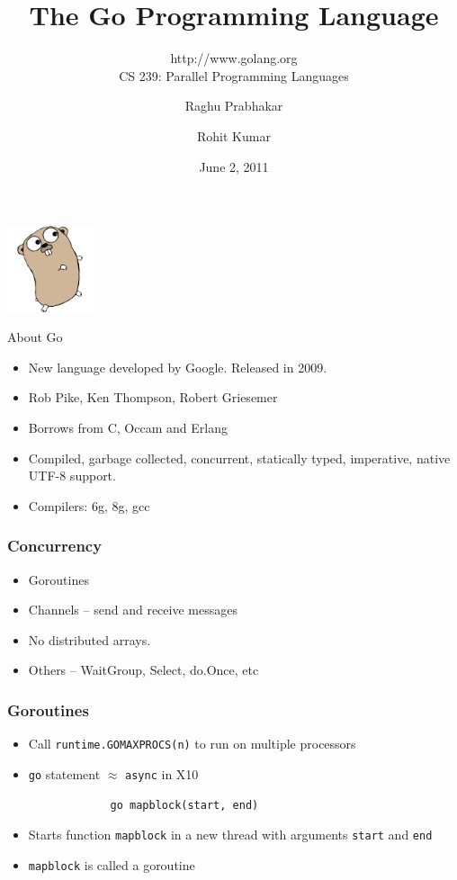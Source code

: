 \documentclass{beamer}
\title{The Go Programming Language}
\subtitle{http://www.golang.org \\ CS 239: Parallel Programming Languages}
\author{Raghu Prabhakar \and Rohit Kumar}
\date{June 2, 2011}
\begin{document}
\begin{frame}
\begin{center}
\includegraphics[width=1in]{gopher.png}
\end{center}
\titlepage
\end{frame}

\begin{frame} {About Go}
\begin{itemize}
  \item New language developed by Google. Released in 2009.
  \item Rob Pike, Ken Thompson, Robert Griesemer
  \item Borrows from C, Occam and Erlang
  \item Compiled, garbage collected, concurrent, statically typed,
    imperative, native UTF-8 support.
  \item Compilers: 6g, 8g, gcc 
\end{itemize}
\end{frame}

\begin{frame}[fragile]
\frametitle{Concurrency}
  \begin{itemize}
    \item Goroutines
    \item Channels -- send and receive messages
    \item No distributed arrays. 
    \item Others -- WaitGroup, Select, do.Once, etc    
  \end{itemize}
\end{frame}

\begin{frame} [fragile]
\frametitle{Goroutines}
\begin{itemize}
  \item Call \verb=runtime.GOMAXPROCS(n)= to run on multiple processors
  \item \verb=go= statement $\approx$ \verb=async= in X10
\end{itemize}
\begin{center}
\begin{verbatim}
                go mapblock(start, end)
\end{verbatim}
\end{center}
\begin{itemize}
\item Starts function \verb=mapblock= in a new thread with arguments \verb=start= and \verb=end=
\item \verb=mapblock= is called a goroutine
\end{itemize}

\end{frame}
\end{document}
